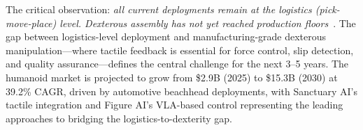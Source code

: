The critical observation: \emph{all current deployments remain at the logistics (pick-move-place) level. Dexterous assembly has not yet reached production floors}~\cite{billard2019trends}. The gap between logistics-level deployment and manufacturing-grade dexterous manipulation---where tactile feedback is essential for force control, slip detection, and quality assurance---defines the central challenge for the next 3--5 years. The humanoid market is projected to grow from \$2.9B (2025) to \$15.3B (2030) at 39.2\% CAGR, driven by automotive beachhead deployments, with Sanctuary AI's tactile integration and Figure AI's VLA-based control representing the leading approaches to bridging the logistics-to-dexterity gap.
